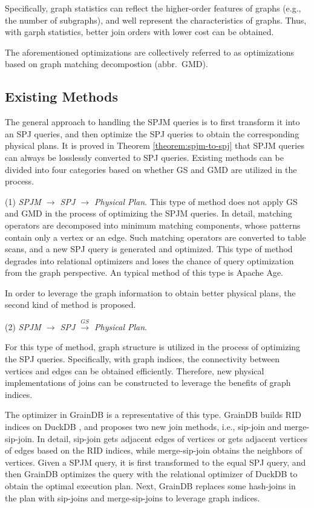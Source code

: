 Specifically, graph statistics can reflect the higher-order features of graphs (e.g., the number of subgraphs), and well represent the characteristics of graphs.
Thus, with garph statistics, better join orders with lower cost can be obtained.

The aforementioned optimizations are collectively referred to as optimizations based on graph matching decompostion (abbr.~GMD).


\subsection{Existing Methods}

The general approach to handling the SPJM queries is to first transform it into an SPJ queries, and then optimize the SPJ queries to obtain the corresponding physical plans.
It is proved in Theorem \ref{theorem:spjm-to-spj} that SPJM queries can always be losslessly converted to SPJ queries.
Existing methods can be divided into four categories based on whether GS and GMD are utilized in the process.

(1) \emph{SPJM $\rightarrow$ SPJ $\rightarrow$ Physical Plan}.
This type of method does not apply GS and GMD in the process of optimizing the SPJM queries.
In detail, matching operators are decomposed into minimum matching components, whose patterns contain only a vertex or an edge.
Such matching operators are converted to table scans, and a new SPJ query is generated and optimized.
This type of method degrades into relational optimizers and loses the chance of query optimization from the graph perspective.
An typical method of this type is Apache Age.


In order to leverage the graph information to obtain better physical plans, the second kind of method is proposed.

(2) \emph{SPJM $\rightarrow$ SPJ $\xrightarrow{GS}$ Physical Plan}.

For this type of method, graph structure is utilized in the process of optimizing the SPJ queries.
Specifically, with graph indices, the connectivity between vertices and edges can be obtained efficiently.
Therefore, new physical implementations of joins can be constructed to leverage the benefits of graph indices.

The optimizer in GrainDB is a representative of this type.
GrainDB builds RID indices on DuckDB \cite{duckdb}, and proposes two new join methods, i.e., sip-join and merge-sip-join.
In detail, sip-join gets adjacent edges of vertices or gets adjacent vertices of edges based on the RID indices, while merge-sip-join obtains the neighbors of vertices.
Given a SPJM query, it is first transformed to the equal SPJ query, and then GrainDB optimizes the query with the relational optimizer of DuckDB to obtain the optimal execution plan.
Next, GrainDB replaces some hash-joins in the plan with sip-joins and merge-sip-joins to leverage graph indices.

